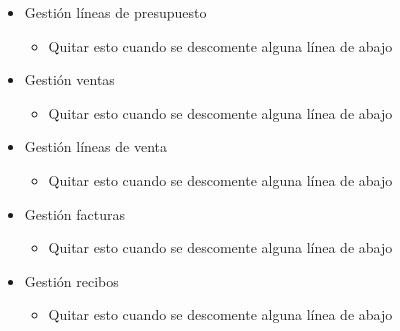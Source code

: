\begin{itemize}
\begin{itemize}
			
		\end{itemize}
		\item Gestión líneas de presupuesto
		\begin{itemize}
			\item Quitar esto cuando se descomente alguna línea de abajo
		\end{itemize}
		\item Gestión ventas
		\begin{itemize}
			\item Quitar esto cuando se descomente alguna línea de abajo
		\end{itemize}
		\item Gestión líneas de venta
		\begin{itemize}
			\item Quitar esto cuando se descomente alguna línea de abajo
		\end{itemize}
		\item Gestión facturas
		\begin{itemize}
			\item Quitar esto cuando se descomente alguna línea de abajo
		\end{itemize}
		\item Gestión recibos
		\begin{itemize}
			\item Quitar esto cuando se descomente alguna línea de abajo

\end{itemize}
\end{itemize}
